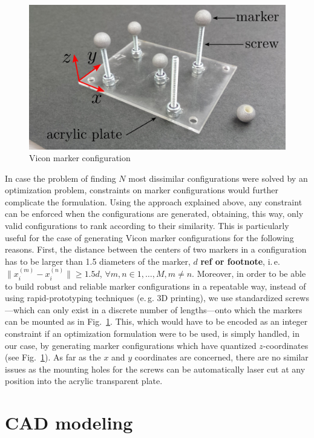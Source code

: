 \documentclass{article}
\begin{document}
\begin{figure}
\centering
\includegraphics[width=\textwidth]{fig/hatscrews.jpg}
\caption{Vicon marker configuration}
\label{fig:hatscrews}
\end{figure}
In case the problem of finding $N$ most dissimilar configurations were solved by an optimization problem, constraints on marker configurations would further complicate the formulation. Using the approach explained above, any constraint can be enforced when the configurations are generated, obtaining, this way, only valid configurations to rank according to their similarity. This is particularly useful for the case of generating Vicon marker configurations for the following reasons. First, the distance between the centers of two markers in a configuration has to be larger than 1.5 diameters of the marker, $d$ \textbf{ref or footnote}, i.\,e. $\|x_i^{(m)}-x_i^{(n)}\|\ge1.5 d$, $\forall m,n\in{1,\ldots,M},m\neq n$. Moreover, in order to be able to build robust and reliable marker configurations in a repeatable way, instead of using rapid-prototyping techniques (e.\,g. 3D printing), we use standardized screws---which can only exist in a discrete number of lengths---onto which the markers can be mounted as in Fig.~\ref{fig:hatscrews}. This, which would have to be encoded as an integer constraint if an optimization formulation were to be used, is simply handled, in our case, by generating marker configurations which have quantized $z$-coordinates (see Fig.~\ref{fig:hatscrews}). As far as the $x$ and $y$ coordinates are concerned, there are no similar issues as the mounting holes for the screws can be automatically laser cut at any position into the acrylic transparent plate.

\section{CAD modeling}
\end{document}
